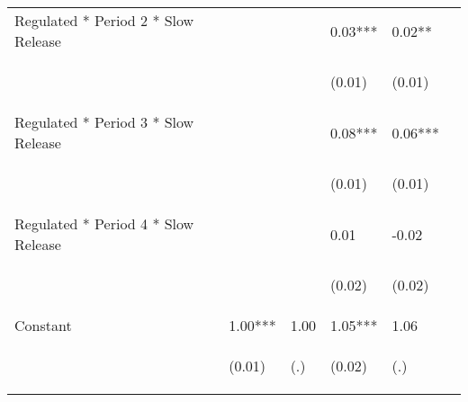 \documentclass[12pt]{article}
\begin{document}
\begin{center}
\begin{longtable}{p{}p{}p{}p{}p{}p{}}
Regulated * Period 2 * Slow Release &  &  & 0.03*** & 0.02** \\
\vspace{2pt} & \begin{footnotesize}\end{footnotesize} & \begin{footnotesize}\end{footnotesize} & \begin{footnotesize}(0.01)\end{footnotesize} & \begin{footnotesize}(0.01)\end{footnotesize} \\
Regulated * Period 3 * Slow Release &  &  & 0.08*** & 0.06*** \\
\vspace{2pt} & \begin{footnotesize}\end{footnotesize} & \begin{footnotesize}\end{footnotesize} & \begin{footnotesize}(0.01)\end{footnotesize} & \begin{footnotesize}(0.01)\end{footnotesize} \\
Regulated * Period 4 * Slow Release &  &  & 0.01 & -0.02 \\
\vspace{2pt} & \begin{footnotesize}\end{footnotesize} & \begin{footnotesize}\end{footnotesize} & \begin{footnotesize}(0.02)\end{footnotesize} & \begin{footnotesize}(0.02)\end{footnotesize} \\
Constant & 1.00*** & 1.00 & 1.05*** & 1.06 \\
 & \begin{footnotesize}(0.01)\end{footnotesize} & \begin{footnotesize}(.)\end{footnotesize} & \begin{footnotesize}(0.02)\end{footnotesize} & \begin{footnotesize}(.)\end{footnotesize} \\

\end{longtable}
\end{center}
\end{document}
